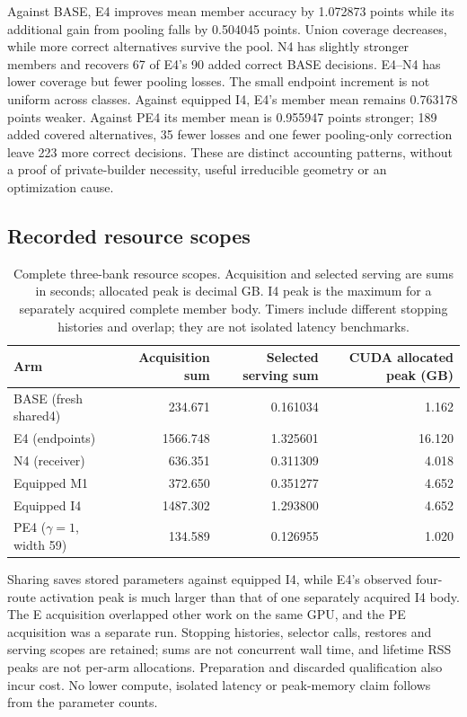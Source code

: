 Against BASE, E4 improves mean member accuracy by 1.072873 points while its additional gain from pooling falls by 0.504045 points. Union coverage decreases, while more correct alternatives survive the pool. N4 has slightly stronger members and recovers 67 of E4's 90 added correct BASE decisions. E4--N4 has lower coverage but fewer pooling losses. The small endpoint increment is not uniform across classes. Against equipped I4, E4's member mean remains 0.763178 points weaker. Against PE4 its member mean is 0.955947 points stronger; 189 added covered alternatives, 35 fewer losses and one fewer pooling-only correction leave 223 more correct decisions. These are distinct accounting patterns, without a proof of private-builder necessity, useful irreducible geometry or an optimization cause.

\subsection{Recorded resource scopes}
\begin{table}[t]
\centering\small\setlength{\tabcolsep}{5pt}
\caption{Complete three-bank resource scopes. Acquisition and selected serving are sums in seconds; allocated peak is decimal GB. I4 peak is the maximum for a separately acquired complete member body. Timers include different stopping histories and overlap; they are not isolated latency benchmarks.}
\label{tab:E-PE-costs}
\begin{tabular}{lrrr}
\toprule
Arm & Acquisition sum & Selected serving sum & CUDA allocated peak (GB)\\
\midrule
BASE (fresh shared4) & 234.671 & 0.161034 & 1.162\\
E4 (endpoints) & 1566.748 & 1.325601 & 16.120\\
N4 (receiver) & 636.351 & 0.311309 & 4.018\\
Equipped M1 & 372.650 & 0.351277 & 4.652\\
Equipped I4 & 1487.302 & 1.293800 & 4.652\\
PE4 ($\gamma=1$, width 59) & 134.589 & 0.126955 & 1.020\\
\bottomrule\end{tabular}\end{table}

Sharing saves stored parameters against equipped I4, while E4's observed four-route activation peak is much larger than that of one separately acquired I4 body. The E acquisition overlapped other work on the same GPU, and the PE acquisition was a separate run. Stopping histories, selector calls, restores and serving scopes are retained; sums are not concurrent wall time, and lifetime RSS peaks are not per-arm allocations. Preparation and discarded qualification also incur cost. No lower compute, isolated latency or peak-memory claim follows from the parameter counts.

